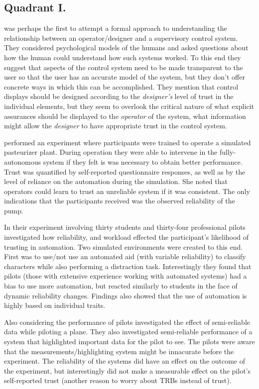 \subsection{Quadrant I.}\label{sec:q1}
\citet{Sheridan1984-kx} was perhaps the first to attempt a formal approach to understanding the relationship between an operator/designer and a supervisory control system. They considered psychological models of the humans and asked questions about how the human could understand how such systems worked. To this end they suggest that aspects of the control system need to be made transparent to the user so that the user has an accurate model of the system, but they don't offer concrete ways in which this can be accomplished. They mention that control displays should be designed according to the \emph{designer's} level of trust in the individual elements, but they seem to overlook the critical nature of what explicit assurances should be displayed to the \emph{operator} of the system,  what information might allow the \emph{designer} to have appropriate trust in the control system.

\citet{Muir1996-gt} performed an experiment where participants were trained to operate a simulated pasteurizer plant. During operation they were able to intervene in the fully-autonomous system if they felt is was necessary to obtain better performance. Trust was quantified by self-reported questionnaire responses, as well as by the level of reliance on the automation during the simulation. She noted that operators could learn to trust an unreliable system if it was consistent. The only indications that the participants received was the observed reliability of the pump. 

In their experiment involving thirty students and thirty-four professional pilots \citet{Riley1996-qm} investigated how reliability, and workload effected the participant's likelihood of trusting in automation. Two simulated environments were created to this end. First was to use/not use an automated aid (with variable reliability) to classify characters while also performing a distraction task. Interestingly they found that pilots (those with extensive experience working with automated systems) had a bias to use more automation, but reacted similarly to students in the face of dynamic reliability changes. Findings also showed that the use of automation is highly based on individual traits.

Also considering the performance of pilots \citet{Wickens1999-la} investigated the effect of semi-reliable data while piloting a plane. They also investigated semi-reliable performance of a system that highlighted important data for the pilot to see. The pilots were aware that the measurements/highlighting system might be innacurate before the experiment. The reliability of the systems did have an effect on the outcome of the experiment, but interestingly did not make a measurable effect on the pilot's self-reported trust (another reason to worry about TRBs instead of trust).

